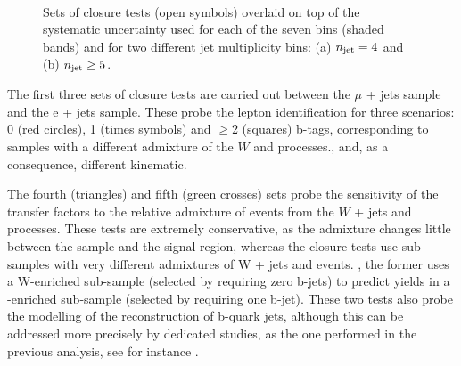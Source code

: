 \begin{figure}[h!]
\begin{center}
     \\
    \caption{Sets of closure tests (open symbols) overlaid on top of
      the systematic uncertainty used for each of the seven \scalht
      bins (shaded bands) and for two different jet
      multiplicity bins: (a) $n_{\text{jet}} = 4$ and (b) $n_{\text{jet}} \geq5$.}
    \label{fig:closure}
  \end{center} 
\end{figure}

The first three sets of closure tests are carried out between the $\mu$ 
+ jets sample and the e + jets sample. These probe the lepton 
identification for three scenarios: 0 (red circles), 
1 (times symbols) and $\geq$2 (squares) b-tags, corresponding to samples with a different admixture of the $W$ and \ttbar processes., 
and, as a consequence, different kinematic. 

The fourth (triangles) and fifth (green crosses) sets probe the
sensitivity of the transfer factors to the relative admixture of
events from the $W$ + jets and \ttbar processes. These tests are
extremely conservative, as the admixture changes little between the
\mj sample and the signal region, whereas the closure tests use
sub-samples with very different admixtures of W + jets and \ttbar
events. \eg, the former uses a W-enriched sub-sample (selected by
requiring zero b-jets) to predict yields in a \ttbar-enriched
sub-sample (selected by requiring one b-jet). 
These two tests also probe the modelling of the reconstruction of b-quark jets, 
although this can be addressed more precisely by dedicated studies, as the one 
performed in the previous analysis, see for instance \cite{CMS_AN_2013-366}.

